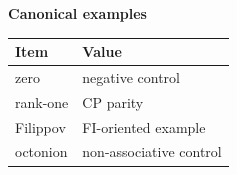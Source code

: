 \begin{center}
\textbf{Canonical examples}\par\smallskip
\begin{tabular}{ll}
\toprule
Item & Value \\
\midrule
zero & negative control \\
rank-one & CP parity \\
Filippov & FI-oriented example \\
octonion & non-associative control \\
\bottomrule
\end{tabular}
\end{center}

